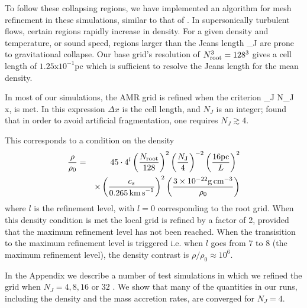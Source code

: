 \documentclass[../dissertation.tex]{subfiles}
\begin{document}
To follow these collapsing regions, we have implemented an algorithm 
for mesh refinement in these simulations, similar to that of \citet{2010ApJ...713..269F}.
In supersonically turbulent flows, certain regions rapidly increase in density.
For a given density and temperature, or sound speed, regions larger than the 
Jeans length
%
\be
\lambda_J \equiv {}  
\label{eq:hydro_Jeans_length}
\ee
%
are prone to gravitational collapse. Our base grid's resolution of $N_{\rm root}^3 = 128^3$ 
gives a cell length of 
$1.25 \text{x} 10^{-1}$pc which is sufficient to resolve the Jeans 
length for the mean density.

In most of our simulations, the AMR grid is refined when the \citet{1997ApJ...489L.179T} criterion 
%
\be
\lambda_J \le N_J \Delta x, 
\ee
%
is met.
In this expression $\Delta x$ is the cell length, and $N_J$ is an integer; \citet{1997ApJ...489L.179T} found that in order to avoid artificial fragmentation, one requires $N_J\gtrsim 4$.

This corresponds to a condition on the density 
%
\begin{eqnarray}
\frac{\rho}{\rho_0} &=& 45 \cdot 4^l
\left( \frac{N_{\rm root}}{128} \right)^2 
\left( \frac{N_{\rm J}}{4} \right)^{-2} 
\left( \frac{16 \rm{pc}}{L} \right)^2 \nonumber\\
&&\times\left( \frac{c_s}{0.265\, {\rm km\, s}^{-1}} \right)^2
\left( \frac{3 \times10^{-22} {\rm g\, cm}^{-3}}{\rho_0} \right)
\label{eq:hydro_refinement_criteria}
\end{eqnarray}
%
where $l$ is the refinement level, with $l = 0$ corresponding to the root grid.
When this density condition is met the local grid is refined by a factor of 2, 
provided that the maximum refinement level has not been reached. 
When the transisition to the maximum refinement level is triggered i.e. when $l$ goes from $7$ to $8$ (the maximum refinement level),
the density contrast is $\rho / \rho_0 \approx 10^6$. 

In the Appendix we describe a number of test simulations in which we refined the grid when 
$N_J=4, 8, 16$ or $32$ \citep{2011ApJ...731...62F}. We show that many of the quantities in our runs, including the density and the mass accretion rates, are converged for $N_J=4$.
\end{document}
